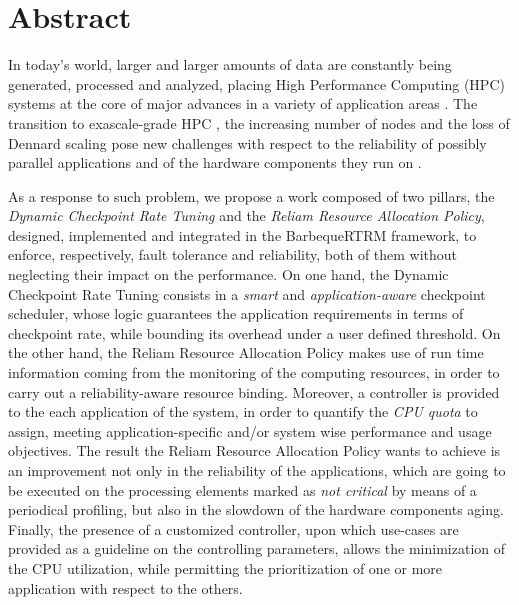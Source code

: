 %

%
%
\chapter*{Abstract}
%
%
In today’s world, larger and larger amounts of data are constantly being generated, processed and analyzed, placing High Performance Computing (HPC) systems at the core of major advances in a variety of application areas \cite{marqube_2020}. The transition to exascale-grade HPC \cite{10.1145/3372390}, the increasing number of nodes and the loss of Dennard scaling pose new challenges with respect to the reliability of possibly parallel applications and of the hardware components they run on \cite{4629245}. 

As a response to such problem, we propose a work composed of two pillars, the \emph{Dynamic Checkpoint Rate Tuning} and the \emph{Reliam Resource Allocation Policy}, designed, implemented and integrated in the BarbequeRTRM framework, to enforce, respectively, fault tolerance and reliability, both of them without neglecting their impact on the performance. On one hand, the Dynamic Checkpoint Rate Tuning consists in a \emph{smart} and \emph{application-aware} checkpoint scheduler, whose logic guarantees the application requirements in terms of checkpoint rate, while bounding its overhead under a user defined threshold. On the other hand, the Reliam Resource Allocation Policy makes use of run time information coming from the monitoring of the computing resources, in order to carry out a reliability-aware resource binding. Moreover, a controller is provided to the each application of the system, in order to quantify the \emph{CPU quota} to assign, meeting application-specific and/or system wise performance and usage objectives.  The result the Reliam Resource Allocation Policy wants to achieve is an improvement not only in the reliability of the applications, which are going to be executed on the processing elements marked as \emph{not critical} by means of a periodical profiling, but also in the slowdown of the hardware components aging. Finally, the presence of a customized controller, upon which use-cases are provided as a guideline on the controlling parameters, allows the minimization of the CPU utilization, while permitting the prioritization of one or more application with respect to the others.


%

